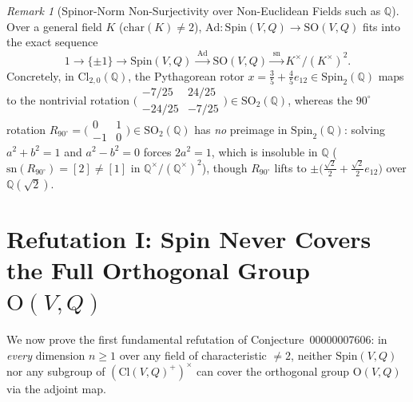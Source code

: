 \documentclass[11pt]{article}
\theoremstyle{definition}
\theoremstyle{remark}
\newtheorem{remark}[theorem]{Remark}
\newcommand{\Cl}{\mathrm{Cl}}
\newcommand{\Spin}{\mathrm{Spin}}
\newcommand{\Ad}{\mathrm{Ad}}
\newcommand{\SO}{\mathrm{SO}}
\newcommand{\Orth}{\mathrm{O}}
\newcommand{\sn}{\mathrm{sn}}
\begin{document}
\begin{remark}[Spinor-Norm Non-Surjectivity over Non-Euclidean Fields such as $\mathbb{Q}$]\label{rem:spinor-norm}
Over a general field $K$ ($\mathrm{char}(K) \ne 2$), $\Ad : \Spin(V,Q) \to \SO(V,Q)$ fits into the exact sequence
\[
1 \longrightarrow \{\pm 1\} \longrightarrow \Spin(V,Q) \xrightarrow{\;\Ad\;} \SO(V,Q) \xrightarrow{\;\sn\;} K^\times / (K^\times)^2.
\]
Concretely, in $\Cl_{2,0}(\mathbb{Q})$, the Pythagorean rotor $x = \frac{3}{5} + \frac{4}{5} e_{12} \in \Spin_2(\mathbb{Q})$ maps to the nontrivial rotation $\bigl(\begin{smallmatrix} -7/25 & 24/25 \\ -24/25 & -7/25 \end{smallmatrix}\bigr) \in \SO_2(\mathbb{Q})$, whereas the $90^\circ$ rotation $R_{90^\circ} = \bigl(\begin{smallmatrix} 0 & 1 \\ -1 & 0 \end{smallmatrix}\bigr) \in \SO_2(\mathbb{Q})$ has \emph{no} preimage in $\Spin_2(\mathbb{Q})$: solving $a^2 + b^2 = 1$ and $a^2 - b^2 = 0$ forces $2a^2 = 1$, which is insoluble in $\mathbb{Q}$ ($\sn(R_{90^\circ}) = [2] \ne [1]$ in $\mathbb{Q}^\times / (\mathbb{Q}^\times)^2$), though $R_{90^\circ}$ lifts to $\pm\bigl(\frac{\sqrt{2}}{2} + \frac{\sqrt{2}}{2} e_{12}\bigr)$ over $\mathbb{Q}(\sqrt{2})$.
\end{remark}

\section{Refutation I: Spin Never Covers the Full Orthogonal Group \texorpdfstring{$\Orth(V,Q)$}{O(V,Q)}}

We now prove the first fundamental refutation of Conjecture~00000007606: in \emph{every} dimension $n \ge 1$ over any field of characteristic $\ne 2$, neither $\Spin(V,Q)$ nor any subgroup of $(\Cl(V,Q)^+)^\times$ can cover the orthogonal group $\Orth(V,Q)$ via the adjoint map.
\end{document}
